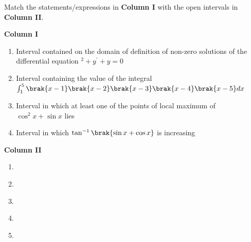 \iffalse
\title{Assignment 2 - EE1030}
\author{ee24btech11018 - D. Swaraj Sharma}
\section{matrix-match}
\fi
\item Match the statements/expressions in \textbf{Column I} with the open intervals in \textbf{Column II}.

	\hfill{}

	\begin{minipage}[t]{0.5\textwidth}
		\textbf{Column I}
		\begin{enumerate}[label=\brak{\Alph*}]
	\item Interval contained on the domain of definition of non-zero solutions of the differential equation $^2+y^{\prime}+y=0$
	\item Interval containing the value of the integral \\$\int_1^5 \brak{x-1}\brak{x-2}\brak{x-3}\brak{x-4}\brak{x-5}dx$
	\item Interval in which at least one of the points of local maximum of $\cos^2 x +\sin x$ lies
	\item Interval in which $\tan^{-1}\brak{\sin x + \cos x}$ is increasing 
	\end{enumerate}
	\end{minipage}
		\begin{minipage}[t]{0.5\textwidth}
			\textbf{Column II}
			\begin{enumerate}[label=\brak{\alph*}]\addtocounter{enumii}{15}
			\item {} \\
			\item {} \\
			\item {} \\
			\item {} \\
			\item \brak{-\pi, \pi} \\
	\end{enumerate}
	\end{minipage}

